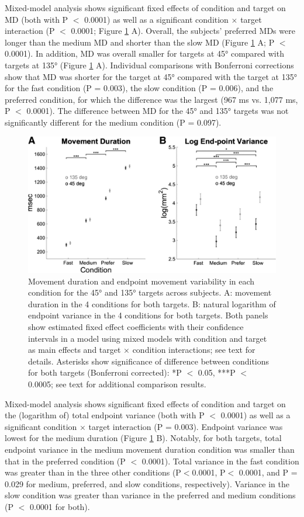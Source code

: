 Mixed-model analysis shows significant fixed effects of condition and target on MD (both with P $<$ 0.0001) as well as a significant condition $\times$ target interaction (P $<$ 0.0001; Figure \ref{fig:mt-data} A). Overall, the subjects’ preferred MDs were longer than the medium MD and shorter than the slow MD (Figure \ref{fig:mt-data} A; P $<$ 0.0001). In addition, MD was overall smaller for targets at \ang{45} compared with targets at \ang{135} (Figure \ref{fig:mt-data} A). Individual comparisons with Bonferroni corrections show that MD was shorter for the target at \ang{45} compared with the target at \ang{135} for the fast condition (P = 0.003), the slow condition (P = 0.006), and the preferred condition, for which the difference was the largest (967 ms vs. 1,077 ms, P $<$ 0.0001). The difference between MD for the \ang{45} and \ang{135} targets was not significantly different for the medium condition (P = 0.097). 

\begin{figure}
	\centering
	\includegraphics[width=0.8\linewidth]{figures/MT-data}
	\caption[Movement duration and endpoint movement variability]{Movement duration and endpoint movement variability in each condition for the \ang{45} and \ang{135} targets across subjects. A: movement duration in the 4 conditions for both targets. B: natural logarithm of endpoint variance in the 4 conditions for both targets. Both panels show estimated fixed effect coefficients with their confidence intervals in a model using mixed models with condition and target as main effects and target × condition interactions; see text for details. Asterisks show significance of difference between conditions for both targets (Bonferroni corrected): *P $<$ 0.05, ***P $<$ 0.0005; see text for additional comparison results.}
	\label{fig:mt-data}
\end{figure}


Mixed-model analysis shows significant fixed effects of condition and target on the (logarithm of) total endpoint variance (both with P $<$ 0.0001) as well as a significant condition $\times$ target interaction (P = 0.003). Endpoint variance was lowest for the medium duration (Figure \ref{fig:mt-data} B). Notably, for both targets, total endpoint variance in the medium movement duration condition was smaller than that in the preferred condition (P $<$ 0.0001). Total variance in the fast condition was greater than in the three other conditions (P$<$0.0001, P$<$ 0.0001, and P = 0.029 for medium, preferred, and slow conditions, respectively). Variance in the slow condition was greater than variance in the preferred and medium conditions (P $<$ 0.0001 for both).


